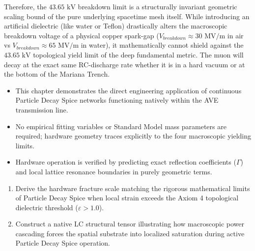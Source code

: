 Therefore, the $43.65 \text{ kV}$ breakdown limit is a structurally invariant geometric scaling bound of the pure underlying spacetime mesh itself. While introducing an artificial dielectric (like water or Teflon) drastically alters the macroscopic breakdown voltage of a physical copper spark-gap ($V_{breakdown} \approx 30 \text{ MV/m}$ in air vs $V_{breakdown} \approx 65 \text{ MV/m}$ in water), it mathematically cannot shield against the $43.65 \text{ kV}$ topological yield limit of the deep fundamental metric. The muon will decay at the exact same RC-discharge rate whether it is in a hard vacuum or at the bottom of the Mariana Trench.

\begin{summarybox}
\begin{itemize}
    \item This chapter demonstrates the direct engineering application of continuous Particle Decay Spice networks functioning natively within the AVE transmission line.
    \item No empirical fitting variables or Standard Model mass parameters are required; hardware geometry traces explicitly to the four macroscopic yielding limits.
    \item Hardware operation is verified by predicting exact reflection coefficients ($\Gamma$) and local lattice resonance boundaries in purely geometric terms.
\end{itemize}
\end{summarybox}

\begin{exercisebox}
\begin{enumerate}
    \item Derive the hardware fracture scale matching the rigorous mathematical limits of Particle Decay Spice when local strain exceeds the Axiom 4 topological dielectric threshold ($\varepsilon > 1.0$).
    \item Construct a native LC structural tensor illustrating how macroscopic power cascading forces the spatial substrate into localized saturation during active Particle Decay Spice operation.
\end{enumerate}
\end{exercisebox}

